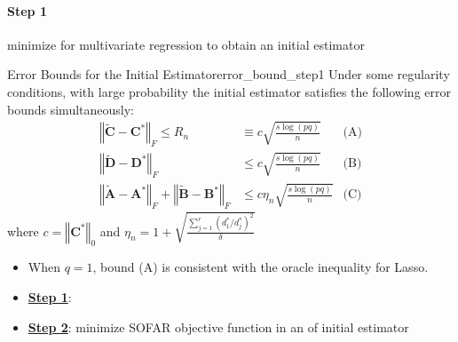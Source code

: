 \documentclass[twoside]{article}
\begin{document}
\paragraph*{Step 1} minimize  for multivariate regression to obtain an initial estimator
\begin{theorem}{Error Bounds for the Initial Estimator}{error_bound_step1}
    Under some regularity conditions, with large probability the initial estimator satisfies the following error bounds simultaneously:
    \begin{align*}
        \left\Vert \tilde{\mathbf{C}}-\mathbf{C}^* \right\Vert _F\leq R_n &\equiv c\sqrt{\frac{s \log (pq)}{n}} & \text{(A)}\\
        \left\Vert \tilde{\mathbf{D}}-\mathbf{D}^* \right\Vert _F &\leq c\sqrt{\frac{s \log (pq)}{n}} &\text{(B)}\\
        \left\Vert \tilde{\mathbf{A}}-\mathbf{A}^* \right\Vert _F + \left\Vert \tilde{\mathbf{B}}-\mathbf{B}^* \right\Vert _F &\leq c\eta_n \sqrt{\frac{s \log (pq)}{n}} & \text{(C)}
    \end{align*}
    where $c= \left\Vert \mathbf{C}^* \right\Vert _0$ and $\eta_n = 1+ \sqrt{\frac{\sum^r_{j=1}(d_1^*/d_j^*)^2}{\delta}} $
\end{theorem}
\begin{itemize}
    \item When $q=1$, bound (A) is consistent with the oracle inequality for Lasso.
\end{itemize}

\begin{itemize}
    \item \underline{\textbf{Step 1}}: 
    \item \underline{\textbf{Step 2}}: minimize SOFAR objective function in an  of initial estimator
\end{itemize}



%
%
\end{document}
